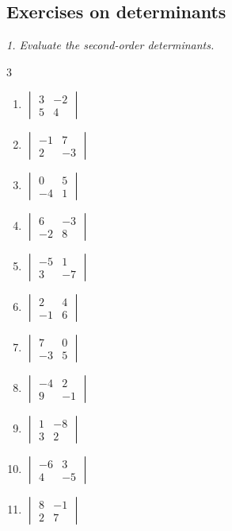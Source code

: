 \subsection{Exercises on determinants}
\bigskip
\emph{1. Evaluate the second-order determinants.}
\bigskip
\begin{multicols}{3}\raggedright
\begin{enumerate}[label=\arabic*.,  leftmargin=*]
\item $\begin{vmatrix} 3 & -2 \\ 5 & 4 \end{vmatrix}$
\item $\begin{vmatrix} -1 & 7 \\ 2 & -3 \end{vmatrix}$
\item $\begin{vmatrix} 0 & 5 \\ -4 & 1 \end{vmatrix}$
\item $\begin{vmatrix} 6 & -3 \\ -2 & 8 \end{vmatrix}$
\item $\begin{vmatrix} -5 & 1 \\ 3 & -7 \end{vmatrix}$
\item $\begin{vmatrix} 2 & 4 \\ -1 & 6 \end{vmatrix}$
\item $\begin{vmatrix} 7 & 0 \\ -3 & 5 \end{vmatrix}$
\item $\begin{vmatrix} -4 & 2 \\ 9 & -1 \end{vmatrix}$
\item $\begin{vmatrix} 1 & -8 \\ 3 & 2 \end{vmatrix}$
\item $\begin{vmatrix} -6 & 3 \\ 4 & -5 \end{vmatrix}$
\item $\begin{vmatrix} 8 & -1 \\ 2 & 7 \end{vmatrix}$

\end{enumerate}
\end{multicols}
